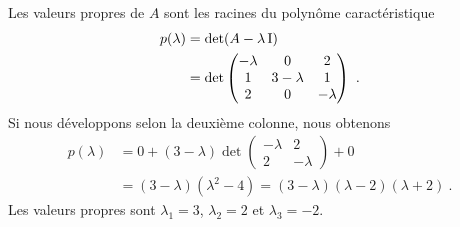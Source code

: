 { Les valeurs propres de $A$ sont les racines du polynôme
caractéristique
\begin{align*}
p(\lambda) &= \det(A-\lambda \operatorname{I}) \\
&= \det
\begin{pmatrix}
-\lambda & 0 & 2 \\1 & 3-\lambda & 1 \\2 & 0 & -\lambda
\end{pmatrix} \ .
\end{align*}
Si nous développons selon la deuxième colonne, nous obtenons
\begin{align*}
p(\lambda) &= 0 + (3-\lambda)
\det\begin{pmatrix}
-\lambda & 2 \\ 2 & -\lambda
\end{pmatrix} + 0 \\
&= (3-\lambda)(\lambda^2 - 4) = (3-\lambda)(\lambda - 2)(\lambda + 2) \ .
\end{align*}
Les valeurs propres sont $\lambda_1 = 3$, $\lambda_2 = 2$ et
$\lambda_3 = -2$.

}

